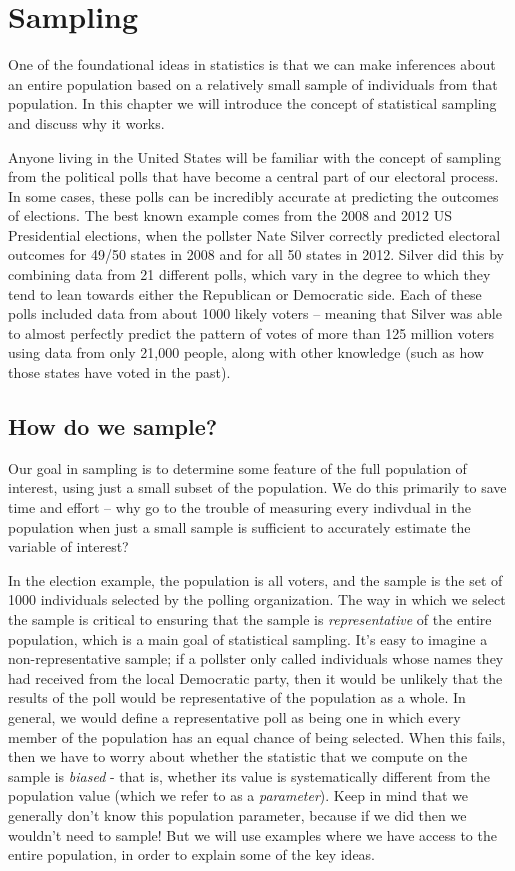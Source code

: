 \documentclass[]{book}
\theoremstyle{definition}
\theoremstyle{definition}
\theoremstyle{definition}
\theoremstyle{remark}
\begin{document}
\chapter{Sampling}\label{sampling-1}

One of the foundational ideas in statistics is that we can make
inferences about an entire population based on a relatively small sample
of individuals from that population. In this chapter we will introduce
the concept of statistical sampling and discuss why it works.

Anyone living in the United States will be familiar with the concept of
sampling from the political polls that have become a central part of our
electoral process. In some cases, these polls can be incredibly accurate
at predicting the outcomes of elections. The best known example comes
from the 2008 and 2012 US Presidential elections, when the pollster Nate
Silver correctly predicted electoral outcomes for 49/50 states in 2008
and for all 50 states in 2012. Silver did this by combining data from 21
different polls, which vary in the degree to which they tend to lean
towards either the Republican or Democratic side. Each of these polls
included data from about 1000 likely voters -- meaning that Silver was
able to almost perfectly predict the pattern of votes of more than 125
million voters using data from only 21,000 people, along with other
knowledge (such as how those states have voted in the past).

\section{How do we sample?}\label{how-do-we-sample}

Our goal in sampling is to determine some feature of the full population
of interest, using just a small subset of the population. We do this
primarily to save time and effort -- why go to the trouble of measuring
every indivdual in the population when just a small sample is sufficient
to accurately estimate the variable of interest?

In the election example, the population is all voters, and the sample is
the set of 1000 individuals selected by the polling organization. The
way in which we select the sample is critical to ensuring that the
sample is \emph{representative} of the entire population, which is a
main goal of statistical sampling. It's easy to imagine a
non-representative sample; if a pollster only called individuals whose
names they had received from the local Democratic party, then it would
be unlikely that the results of the poll would be representative of the
population as a whole. In general, we would define a representative poll
as being one in which every member of the population has an equal chance
of being selected. When this fails, then we have to worry about whether
the statistic that we compute on the sample is \emph{biased} - that is,
whether its value is systematically different from the population value
(which we refer to as a \emph{parameter}). Keep in mind that we
generally don't know this population parameter, because if we did then
we wouldn't need to sample! But we will use examples where we have
access to the entire population, in order to explain some of the key
ideas.
\end{document}
